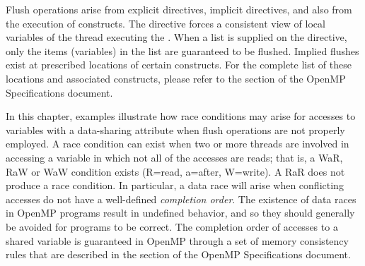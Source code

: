 Flush operations arise from explicit  directives, implicit
 directives, and also from the execution of 
constructs. The  directive forces a  consistent view of local
variables of the thread executing the .  When a list is supplied on
the directive, only the items (variables) in the list are guaranteed to be
flushed.  Implied flushes exist at prescribed locations of certain constructs.
For the complete list of these locations and associated constructs, please
refer to the  section of the OpenMP Specifications
document.

In this chapter, examples illustrate how race conditions may arise for accesses
to variables with a  data-sharing attribute when flush operations
are not properly employed.  A race condition can exist when two or more threads
are involved in accessing a variable in which not all of the accesses are
reads; that is, a WaR, RaW or WaW condition exists (R=read, a=after, W=write).
A RaR does not produce a race condition. In particular, a data race will arise
when conflicting accesses do not have a well-defined \emph{completion order}.
The existence of data races in OpenMP programs result in undefined behavior,
and so they should generally be avoided for programs to be correct.  The
completion order of accesses to a shared variable is guaranteed in OpenMP
through a set of memory consistency rules that are described in the  section of the OpenMP Specifications document.




